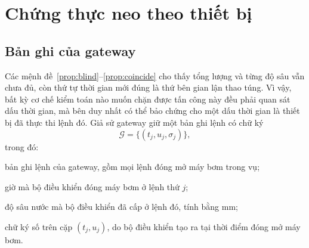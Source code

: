 \section{Chứng thực neo theo thiết bị}
\label{sec:anchor}

\subsection{Bản ghi của gateway}

Các mệnh đề~\ref{prop:blind}--\ref{prop:coincide} cho thấy tổng lượng và từng độ
sâu vẫn chưa đủ, còn thứ tự thời gian mới đúng là thứ bên gian lận thao túng. Vì vậy, bất kỳ cơ chế kiểm toán nào muốn chặn được tấn công này đều phải quan sát
dấu thời gian, mà bên duy nhất có thể bảo chứng cho một dấu thời gian là thiết bị
đã thực thi lệnh đó. Giả sử gateway giữ một bản ghi
lệnh có chữ ký
\begin{equation}
\mathcal{G}=\{(t_j,u_j,\sigma_j)\},
\label{eq:gateway}
\end{equation}
trong đó:
\begin{symbolist}
\item[$\mathcal{G}$] bản ghi lệnh của gateway, gồm mọi lệnh đóng mở máy bơm trong vụ;
\item[$t_j$] giờ mà bộ điều khiển đóng máy bơm ở lệnh thứ $j$;
\item[$u_j$] độ sâu nước mà bộ điều khiển đã cấp ở lệnh đó, tính bằng mm;
\item[$\sigma_j$] chữ ký số trên cặp $(t_j,u_j)$, do bộ điều khiển tạo ra tại thời điểm đóng mở máy bơm.
\end{symbolist}

